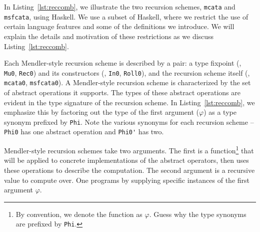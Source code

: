 In Listing~\ref{lst:reccomb}, we illustrate the two recursion schemes,
\lstinline{mcata} and \lstinline{msfcata}, using Haskell.
We use a subset of Haskell, where we restrict the use of certain language
features and some of the definitions we introduce. We will explain
the details and motivation of these restrictions as we discuss
Listing~\ref{lst:reccomb}.

Each Mendler-style recursion scheme is described by a pair:
a type fixpoint (\eg, \lstinline{Mu0}, \lstinline{Rec0}) and
its constructors (\eg, \lstinline{In0}, \lstinline{Roll0}),
and the recursion scheme itself (\eg, \lstinline{mcata0}, \lstinline{msfcata0}).
A Mendler-style recursion scheme is characterized by
the set of abstract operations it supports. The types of
these abstract operations are evident in the type signature
of the recursion scheme. In Listing~\ref{lst:reccomb},
we emphasize this by factoring out the type of the first argument ($\varphi$)
as a type synonym prefixed by \lstinline{Phi}. Note the various synonyms
for each recursion scheme -- \lstinline{Phi0} has one abstract operation
and \lstinline{Phi0'} has two.

Mendler-style recursion schemes take two arguments.
The first is a function\footnote{By convention,
	we denote the function as $\varphi$. Guess why
	the type synonyms are prefixed by \lstinline{Phi}.}
that will be applied to concrete implementations of the abstract operators,
then uses these operations to describe the computation.
The second argument is a recursive value to compute over.
One programs by supplying specific instances of the first argument $\varphi$.

